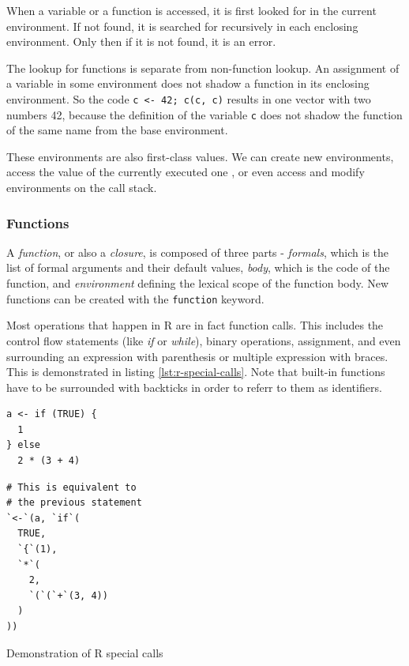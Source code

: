When a variable or a function is accessed, it is first looked for in the current environment. If not found, it is searched for recursively in each enclosing environment. Only then if it is not found, it is an error.

The lookup for functions is separate from non-function lookup. An assignment of a variable in some environment does not shadow a function in its enclosing environment. So the code \texttt{c <- 42; c(c, c)} results in one vector with two numbers 42, because the definition of the variable \texttt{c} does not shadow the function of the same name from the base environment.

These environments are also first-class values. We can create new environments, access the value of the currently executed one , or even access and modify environments on the call stack.

\subsubsection*{Functions}

A \textit{function}, or also a \textit{closure}, is composed of three parts - \textit{formals}, which is the list of formal arguments and their default values, \textit{body}, which is the code of the function, and \textit{environment} defining the lexical scope of the function body. New functions can be created with the \texttt{function} keyword.

Most operations that happen in R are in fact function calls. This includes the control flow statements (like \textit{if} or \textit{while}), binary operations, assignment, and even surrounding an expression with parenthesis or multiple expression with braces. This is demonstrated in listing \ref{lst:r-special-calls}. Note that built-in functions have to be surrounded with backticks in order to referr to them as identifiers.

\begin{listing}[ht!]
	\begin{sublisting}[t!]{0.47\textwidth}
		\centering
		\begin{verbatim}
a <- if (TRUE) {
  1
} else
  2 * (3 + 4)
    \end{verbatim}
	\end{sublisting}
	\hfill
	\begin{sublisting}[t!]{0.47\textwidth}
		\centering
		\begin{verbatim}
# This is equivalent to
# the previous statement
`<-`(a, `if`(
  TRUE,
  `{`(1),
  `*`(
    2,
    `(`(`+`(3, 4))
  )
))
    \end{verbatim}
	\end{sublisting}
	\caption{Demonstration of R special calls}\label{lst:r-special-calls}
\end{listing}

